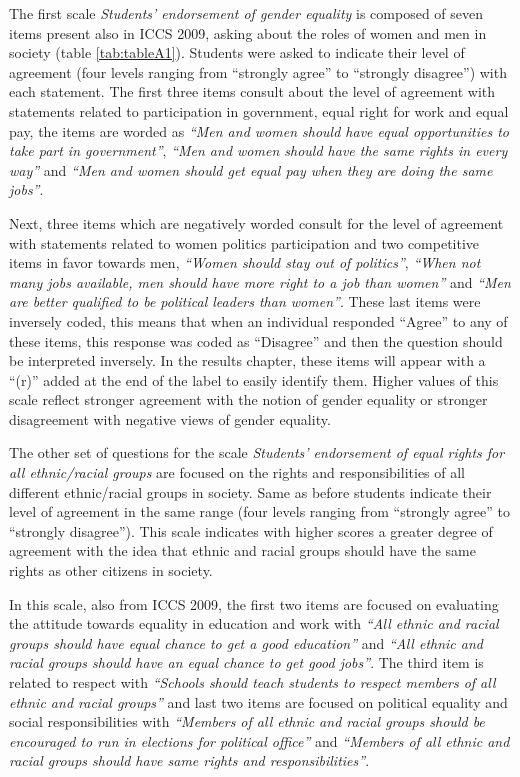 \documentclass[12pt,a4paper,oneside]{reedthesis}
\begin{document}
The first scale \emph{Students' endorsement of gender equality} is composed of seven items present also in ICCS 2009, asking about the roles of women and men in society (table \ref{tab:tableA1}). Students were asked to indicate their level of agreement (four levels ranging from ``strongly agree'' to ``strongly disagree'') with each statement. The first three items consult about the level of agreement with statements related to participation in government, equal right for work and equal pay, the items are worded as \emph{``Men and women should have equal opportunities to take part in government''}, \emph{``Men and women should have the same rights in every way''} and \emph{``Men and women should get equal pay when they are doing the same jobs''}.

Next, three items which are negatively worded consult for the level of agreement with statements related to women politics participation and two competitive items in favor towards men, \emph{``Women should stay out of politics''}, \emph{``When not many jobs available, men should have more right to a job than women''} and \emph{``Men are better qualified to be political leaders than women''}. These last items were inversely coded, this means that when an individual responded ``Agree'' to any of these items, this response was coded as ``Disagree'' and then the question should be interpreted inversely. In the results chapter, these items will appear with a ``(r)'' added at the end of the label to easily identify them. Higher values of this scale reflect stronger agreement with the notion of gender equality or stronger disagreement with negative views of gender equality.

The other set of questions for the scale \emph{Students' endorsement of equal rights for all ethnic/racial groups} are focused on the rights and responsibilities of all different ethnic/racial groups in society. Same as before students indicate their level of agreement in the same range (four levels ranging from ``strongly agree'' to ``strongly disagree''). This scale indicates with higher scores a greater degree of agreement with the idea that ethnic and racial groups should have the same rights as other citizens in society.

In this scale, also from ICCS 2009, the first two items are focused on evaluating the attitude towards equality in education and work with \emph{``All ethnic and racial groups should have equal chance to get a good education''} and \emph{``All ethnic and racial groups should have an equal chance to get good jobs''}. The third item is related to respect with \emph{``Schools should teach students to respect members of all ethnic and racial groups''} and last two items are focused on political equality and social responsibilities with \emph{``Members of all ethnic and racial groups should be encouraged to run in elections for political office''} and \emph{``Members of all ethnic and racial groups should have same rights and responsibilities''}.
\end{document}
